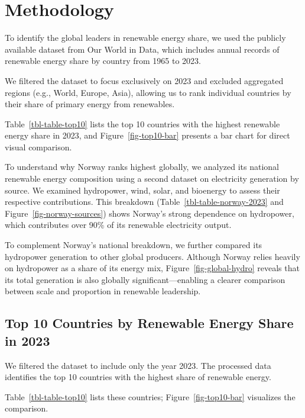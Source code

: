 \documentclass[
  letterpaper,
  DIV=11,
  numbers=noendperiod]{scrartcl}
\begin{document}
\newpage

\section{Methodology}\label{methodology}

To identify the global leaders in renewable energy share, we used the
publicly available dataset from Our World in Data, which includes annual
records of renewable energy share by country from 1965 to 2023.

We filtered the dataset to focus exclusively on 2023 and excluded
aggregated regions (e.g., World, Europe, Asia), allowing us to rank
individual countries by their share of primary energy from renewables.

Table~\ref{tbl-table-top10} lists the top 10 countries with the highest
renewable energy share in 2023, and Figure~\ref{fig-top10-bar} presents
a bar chart for direct visual comparison.

To understand why Norway ranks highest globally, we analyzed its
national renewable energy composition using a second dataset on
electricity generation by source. We examined hydropower, wind, solar,
and bioenergy to assess their respective contributions. This breakdown
(Table~\ref{tbl-table-norway-2023} and Figure~\ref{fig-norway-sources})
shows Norway's strong dependence on hydropower, which contributes over
90\% of its renewable electricity output.

To complement Norway's national breakdown, we further compared its
hydropower generation to other global producers. Although Norway relies
heavily on hydropower as a share of its energy mix,
Figure~\ref{fig-global-hydro} reveals that its total generation is also
globally significant---enabling a clearer comparison between scale and
proportion in renewable leadership.

\subsection{Top 10 Countries by Renewable Energy Share in
2023}\label{top-10-countries-by-renewable-energy-share-in-2023}

We filtered the dataset to include only the year 2023. The processed
data identifies the top 10 countries with the highest share of renewable
energy.

Table~\ref{tbl-table-top10} lists these countries;
Figure~\ref{fig-top10-bar} visualizes the comparison.
\end{document}
